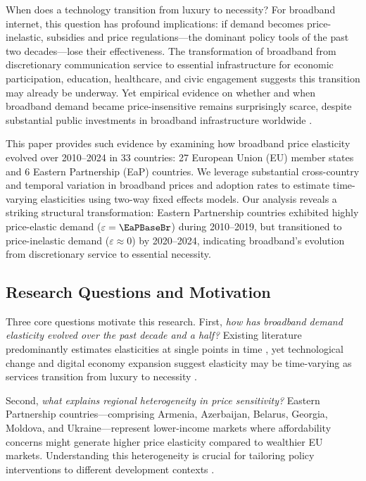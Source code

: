 When does a technology transition from luxury to necessity? For broadband internet, this question has profound implications: if demand becomes price-inelastic, subsidies and price regulations---the dominant policy tools of the past two decades---lose their effectiveness. The transformation of broadband from discretionary communication service to essential infrastructure for economic participation, education, healthcare, and civic engagement \citep{katz2010impact, bertschek2016drivers} suggests this transition may already be underway. Yet empirical evidence on whether and when broadband demand became price-insensitive remains surprisingly scarce, despite substantial public investments in broadband infrastructure worldwide \citep{oecd2020broadband}.

This paper provides such evidence by examining how broadband price elasticity evolved over 2010--2024 in 33 countries: 27 European Union (EU) member states and 6 Eastern Partnership (EaP) countries. We leverage substantial cross-country and temporal variation in broadband prices and adoption rates to estimate time-varying elasticities using two-way fixed effects models. Our analysis reveals a striking structural transformation: Eastern Partnership countries exhibited highly price-elastic demand ($\varepsilon = \EaPBaseBr$) during 2010--2019, but transitioned to price-inelastic demand ($\varepsilon \approx 0$) by 2020--2024, indicating broadband's evolution from discretionary service to essential necessity.

\subsection{Research Questions and Motivation}

Three core questions motivate this research. First, \textit{how has broadband demand elasticity evolved over the past decade and a half?} Existing literature predominantly estimates elasticities at single points in time \citep{dauvin2014estimating, madden2015demand}, yet technological change and digital economy expansion suggest elasticity may be time-varying as services transition from luxury to necessity \citep{hausman2001private}. 

Second, \textit{what explains regional heterogeneity in price sensitivity?} Eastern Partnership countries---comprising Armenia, Azerbaijan, Belarus, Georgia, Moldova, and Ukraine---represent lower-income markets where affordability concerns might generate higher price elasticity compared to wealthier EU markets. Understanding this heterogeneity is crucial for tailoring policy interventions to different development contexts \citep{waverman2001telecommunications}.

